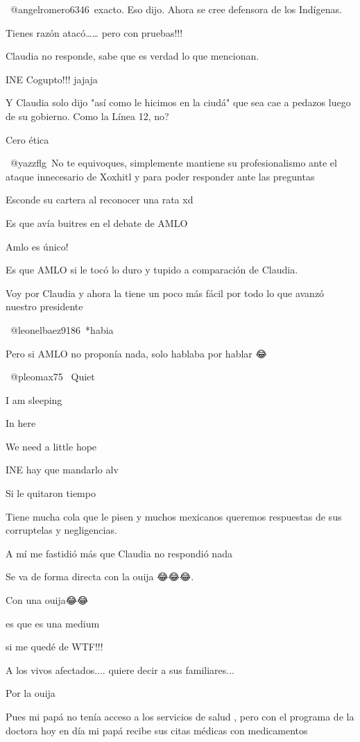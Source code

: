 ​ @angelromero6346 exacto. Eso dijo. Ahora se cree defensora de los Indígenas.

Tienes razón atacó…… pero con pruebas!!!👏👏👏👏

Claudia no responde,  sabe que es verdad lo que mencionan.

INE Cogupto!!! jajaja

Y Claudia solo dijo "así como le hicimos en la ciudá" que sea cae a pedazos luego de su gobierno. Como la Línea 12, no?

Cero ética

​ @yazzflg No te equivoques, simplemente mantiene su profesionalismo ante el ataque innecesario de Xoxhitl y para poder responder ante las preguntas

Esconde su cartera al reconocer una rata xd

Es que avía buitres en el debate de AMLO

Amlo es único!

Es que AMLO si le tocó lo duro y tupido a comparación de Claudia. 

Voy por Claudia y ahora la tiene un poco más fácil por todo lo que avanzó nuestro presidente

 @leonelbaez9186 *habia

Pero si AMLO no proponía nada, solo hablaba por hablar 😂

 @pleomax75  
Quiet

I am sleeping

In here

We need a little hope

INE hay que mandarlo alv

Si le quitaron tiempo

Tiene mucha cola que le pisen y muchos mexicanos queremos respuestas de sus corruptelas y negligencias.

A mí me fastidió más que Claudia no respondió nada

Se va de forma directa con la ouija 😂😂😂.

Con una ouija😂😂

es que es una medium

si me quedé de WTF!!!

A los vivos afectados.... quiere decir a sus familiares...

Por la ouija 🕴🏻

Pues mi papá no tenía acceso a los servicios de salud , pero con el programa de la doctora hoy en día mi papá recibe sus citas médicas con medicamentos

